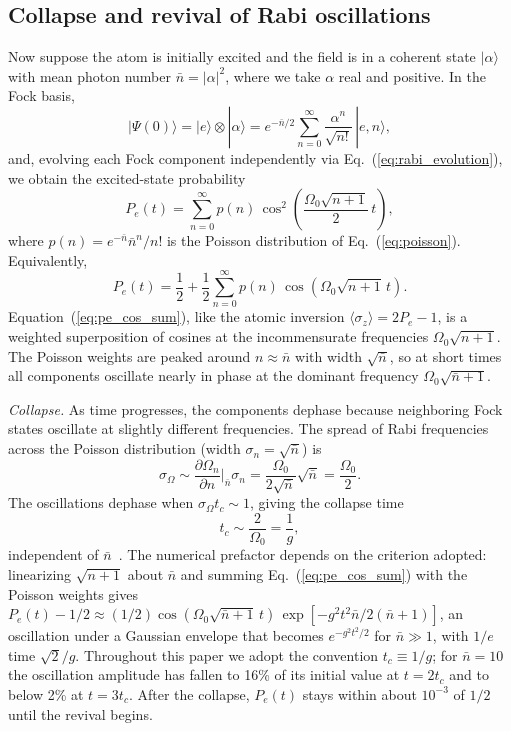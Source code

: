 \documentclass[%
 reprint,
 amsmath,amssymb,
 aps,
 floatfix,
]{revtex4-2}
\begin{document}
\subsection{Collapse and revival of Rabi oscillations}
\label{sec:collapse_revival}

Now suppose the atom is initially excited and the field is in a coherent state $|\alpha\rangle$ with mean photon number $\bar{n} = |\alpha|^2$, where we take $\alpha$ real and positive. In the Fock basis,
\begin{equation}
|\Psi(0)\rangle = |e\rangle \otimes |\alpha\rangle = e^{-\bar{n}/2}\sum_{n=0}^{\infty} \frac{\alpha^n}{\sqrt{n!}}\,|e, n\rangle,
\end{equation}
and, evolving each Fock component independently via Eq.~(\ref{eq:rabi_evolution}), we obtain the excited-state probability
\begin{equation}
P_e(t) = \sum_{n=0}^{\infty} p(n)\,\cos^2\!\left(\frac{\Omega_0\sqrt{n+1}}{2}\,t\right),
\label{eq:pe_coherent}
\end{equation}
where $p(n) = e^{-\bar{n}}\bar{n}^n/n!$ is the Poisson distribution of Eq.~(\ref{eq:poisson}). Equivalently,
\begin{equation}
P_e(t) = \frac{1}{2} + \frac{1}{2}\sum_{n=0}^{\infty} p(n)\,\cos\!\left(\Omega_0\sqrt{n+1}\,t\right).
\label{eq:pe_cos_sum}
\end{equation}
Equation~(\ref{eq:pe_cos_sum}), like the atomic inversion $\langle\sigma_z\rangle = 2P_e - 1$, is a weighted superposition of cosines at the incommensurate frequencies $\Omega_0\sqrt{n+1}$. The Poisson weights are peaked around $n \approx \bar{n}$ with width $\sqrt{\bar{n}}$, so at short times all components oscillate nearly in phase at the dominant frequency $\Omega_0\sqrt{\bar{n}+1}$.

\textit{Collapse.} As time progresses, the components dephase because neighboring Fock states oscillate at slightly different frequencies. The spread of Rabi frequencies across the Poisson distribution (width $\sigma_n = \sqrt{\bar{n}}$) is
\begin{equation}
\sigma_\Omega \sim \frac{\partial\Omega_n}{\partial n}\bigg|_{\bar{n}} \sigma_n = \frac{\Omega_0}{2\sqrt{\bar{n}}} \sqrt{\bar{n}} = \frac{\Omega_0}{2}.
\end{equation}
The oscillations dephase when $\sigma_\Omega t_c \sim 1$, giving the collapse time
\begin{equation}
t_c \sim \frac{2}{\Omega_0} = \frac{1}{g},
\label{eq:t_collapse}
\end{equation}
independent of $\bar{n}$~\cite{eberly1980}. The numerical prefactor depends on the criterion adopted: linearizing $\sqrt{n+1}$ about $\bar{n}$ and summing Eq.~(\ref{eq:pe_cos_sum}) with the Poisson weights gives $P_e(t) - 1/2 \approx (1/2)\cos(\Omega_0\sqrt{\bar{n}+1}\,t)\,\exp[-g^2t^2\bar{n}/2(\bar{n}+1)]$, an oscillation under a Gaussian envelope that becomes $e^{-g^2t^2/2}$ for $\bar{n} \gg 1$, with $1/e$ time $\sqrt{2}/g$. Throughout this paper we adopt the convention $t_c \equiv 1/g$; for $\bar{n} = 10$ the oscillation amplitude has fallen to 16\% of its initial value at $t = 2t_c$ and to below 2\% at $t = 3t_c$. After the collapse, $P_e(t)$ stays within about $10^{-3}$ of $1/2$ until the revival begins.
\end{document}
